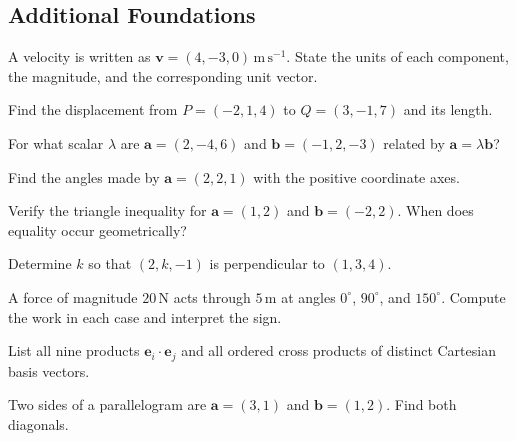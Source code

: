 \subsection*{Additional Foundations}
\begin{chapterexercise}
A velocity is written as $\mathbf v=(4,-3,0)\,\mathrm{m\,s^{-1}}$. State the units of each component, the magnitude, and the corresponding unit vector.
\end{chapterexercise}
\begin{chapterexercise}
Find the displacement from $P=(-2,1,4)$ to $Q=(3,-1,7)$ and its length.
\end{chapterexercise}
\begin{chapterexercise}
For what scalar $\lambda$ are $\mathbf a=(2,-4,6)$ and $\mathbf b=(-1,2,-3)$ related by $\mathbf a=\lambda\mathbf b$?
\end{chapterexercise}
\begin{chapterexercise}
Find the angles made by $\mathbf a=(2,2,1)$ with the positive coordinate axes.
\end{chapterexercise}
\begin{chapterexercise}
Verify the triangle inequality for $\mathbf a=(1,2)$ and $\mathbf b=(-2,2)$. When does equality occur geometrically?
\end{chapterexercise}
\begin{chapterexercise}
Determine $k$ so that $(2,k,-1)$ is perpendicular to $(1,3,4)$.
\end{chapterexercise}
\begin{chapterexercise}
A force of magnitude $20\,\mathrm N$ acts through $5\,\mathrm m$ at angles $0^\circ$, $90^\circ$, and $150^\circ$. Compute the work in each case and interpret the sign.
\end{chapterexercise}
\begin{chapterexercise}
List all nine products $\mathbf e_i\cdot\mathbf e_j$ and all ordered cross products of distinct Cartesian basis vectors.
\end{chapterexercise}
\begin{chapterexercise}
Two sides of a parallelogram are $\mathbf a=(3,1)$ and $\mathbf b=(1,2)$. Find both diagonals.
\end{chapterexercise}
